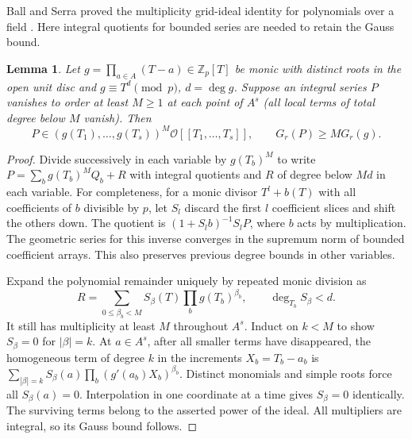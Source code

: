 \documentclass[11pt]{article}
\newtheorem{lemma}[theorem]{Lemma}
\theoremstyle{definition}\newtheorem{example}[theorem]{Example}
\newcommand{\OO}{\mathcal O}
\newcommand{\Zp}{\mathbb Z_p}
\begin{document}
Ball and Serra proved the multiplicity grid-ideal identity for polynomials
over a field \cite[Theorem~3.1]{ballserra}. Here integral quotients for
bounded series are needed to retain the Gauss bound.
\begin{lemma}\label{lem:grid}
Let $g=\prod_{a\in A}(T-a)\in\Zp[T]$ be monic with distinct roots in the
open unit disc and $g\equiv T^d\pmod p$, $d=\deg g$. Suppose an integral
series $P$ vanishes to order at least $M\ge1$ at each point of $A^s$
(all local terms of total degree below $M$ vanish). Then
\[
 P\in(g(T_1),\ldots,g(T_s))^M\OO[[T_1,\ldots,T_s]],
 \qquad G_r(P)\ge M G_r(g).
\]
\end{lemma}
\begin{proof}
Divide successively in each variable by $g(T_b)^M$ to write
$P=\sum_b g(T_b)^M Q_b+R$ with integral quotients and $R$ of degree
below $Md$ in each variable. For completeness, for a monic divisor
$T^l+b(T)$ with all coefficients of $b$ divisible by $p$, let $S_l$ discard
the first $l$ coefficient slices and shift the others down. The quotient is
$(1+S_l b)^{-1}S_lP$, where $b$ acts by multiplication. The geometric
series for this inverse converges in the supremum norm of bounded coefficient
arrays. This also preserves previous degree bounds in other variables.

Expand the polynomial remainder uniquely by repeated monic division as
\[
 R=\sum_{0\le\beta_b<M} S_\beta(T)\prod_b g(T_b)^{\beta_b},
 \qquad \deg_{T_b}S_\beta<d .
\]
It still has multiplicity at least $M$ throughout $A^s$.
Induct on $k<M$ to show $S_\beta=0$ for $|\beta|=k$. At $a\in A^s$,
after all smaller terms have disappeared, the homogeneous term of degree $k$
in the increments $X_b=T_b-a_b$ is
$\sum_{|\beta|=k}S_\beta(a)\prod_b(g'(a_b)X_b)^{\beta_b}$.
Distinct monomials and simple roots force all $S_\beta(a)=0$.
Interpolation in one coordinate at a time gives $S_\beta=0$ identically.
The surviving terms belong to the asserted power of the ideal.
All multipliers are integral, so its Gauss bound follows.
\end{proof}
\end{document}

